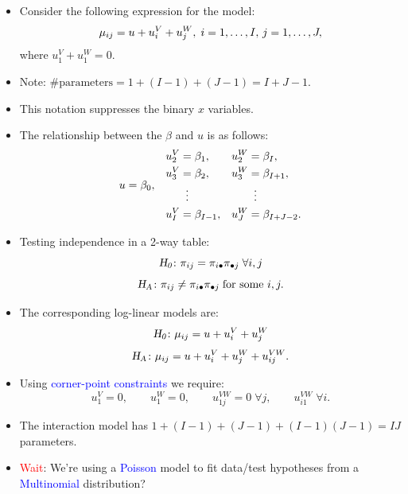 \documentclass{article}\usepackage[]{graphicx}\usepackage[svgnames]{xcolor}
\let\log\relax%
\newcommand{\HN}{\textsl{H}_{\textsl{0}}}%
\newcommand{\HA}{\textsl{H}_{\textsl{A}}}%
\begin{document}
\begin{itemize}
    \item Consider the following expression for the model:
          \[ \log{\mu_{ij}}=u+u_i^V+u_j^W,\;i=1,\ldots,I,\,j=1,\ldots,J, \]
          where $ u_1^V+u_1^W=0 $.
    \item Note: $ \text{\# parameters}=1+(I-1)+(J-1)=I+J-1 $.
    \item This notation suppresses the binary $ x $ variables.
    \item The relationship between the $ \beta $ and $ u $ is as follows:
          \[ \begin{array}{ccc}
                  u=\beta_0,                 &
                  \begin{aligned}
                      u_2^V & =\beta_1,       \\
                      u_3^V & =\beta_2,       \\
                            & \vdotswithin{=} \\
                      u_I^V & =\beta_{I-1},
                  \end{aligned} &
                  \begin{aligned}
                      u_2^W & =\beta_I,       \\
                      u_3^W & =\beta_{I+1},   \\
                            & \vdotswithin{=} \\
                      u_J^W & =\beta_{I+J-2}.
                  \end{aligned}
              \end{array} \]
    \item Testing independence in a 2-way table:
          \[ \HN\colon \pi_{ij}=\pi_{i\bullet}\pi_{\bullet j}\;\forall i,j \]
          \[ \HA\colon \pi_{ij}\ne \pi_{i\bullet}\pi_{\bullet j}\;\text{for some } i,j. \]
    \item The corresponding log-linear models are:
          \[ \HN\colon \log{\mu_{ij}}=u+u_i^V+u_j^W \]
          \[ \HA\colon\log{\mu_{ij}}=u+u_i^V+u_j^W+u_{ij}^{VW}. \]
    \item Using \textcolor{Blue}{corner-point constraints} we require:
          \[ u_1^V=0,\qquad u_1^W=0,\qquad u_{1j}^{VW}=0\;\forall j,\qquad u_{i1}^{VW}\;\forall i. \]
    \item The interaction model has $ 1+(I-1)+(J-1)+(I-1)(J-1)=IJ $ parameters.
    \item \textcolor{Red}{Wait}: We're using a \textcolor{Blue}{Poisson} model to fit data/test hypotheses from a \textcolor{Blue}{Multinomial} distribution?

\end{itemize}
\end{document}
